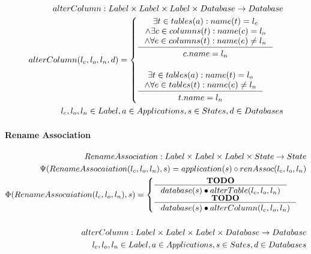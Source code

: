 \documentclass[11pt]{article}
\begin{document}
\begin{align*}
alterColumn : Label \times Label \times Label \times Database \rightarrow Database \\
	alterColumn(l_c, l_o, l_n, d) = \begin{cases}
 \inference{\exists t \in tables(a) : name(t) = l_c \\ \wedge \exists c \in columns(t) : name(c) = l_o \\ \wedge \forall e \in columns(t) : name(e) \neq l_n}{\begin{gathered}
c.name = l_n 
\end{gathered}}
\\ \\
\inference{\exists t \in tables(a) : name(t) = l_o \\ \wedge \forall e \in tables(t) : name(e) \neq l_n}{\begin{gathered}
t.name = l_n 
\end{gathered}}
 \end{cases}
 \\
l_c, l_o, l_n \in Label, a \in Applications, s \in States, d \in Databases
\end{align*}

\paragraph{Rename Association}
\begin{align*}
RenameAssociation : Label \times Label \times Label \times State \rightarrow State \\
\Psi(RenameAssocaiation(l_c, l_o, l_n), s) = application(s) \circ renAssoc(l_c, l_o, l_n)\\
\Phi(RenameAssocaiation(l_c, l_o, l_n), s) = \begin{cases}
	\inference{\mathbf{TODO}}{database(s) \bullet alterTable(l_c, l_o, l_n)}
 \\
  \inference{\mathbf{TODO}}{database(s) \bullet alterColumn(l_c, l_o, l_n)}
 \end{cases}
\\\\
alterColumn : Label \times Label \times Label \times Database \rightarrow Database \\
l_c, l_o, l_n \in Label, a \in Applications, s \in Sates, d \in Databases
\end{align*}
\end{document}
